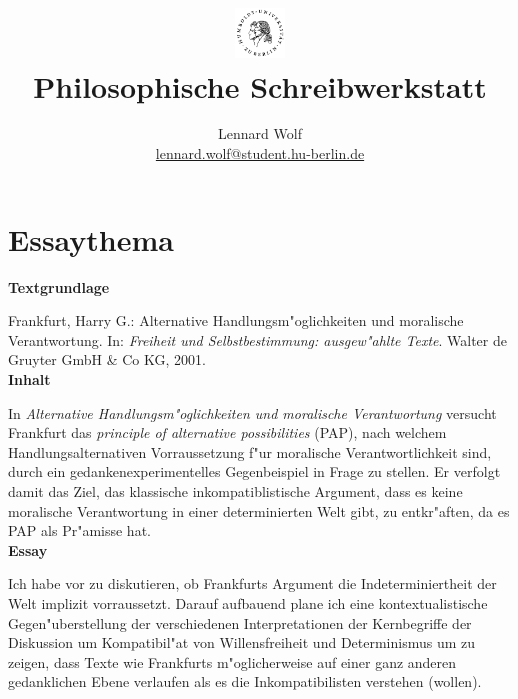 \documentclass[a4paper]{article}
\date{\vspace{-3ex}}
\begin{document}
\title{
    \vspace{-30pt}
	\includegraphics*[width=0.1\textwidth,left]{images/hu_logo2.png}\\
	\vspace{-10pt}
	Philosophische Schreibwerkstatt}
\author{Lennard Wolf\\
        \small{\href{mailto:lennard.wolf@student.hu-berlin.de}{lennard.wolf@student.hu-berlin.de}}}
\maketitle
\vspace{0pt}

\section*{Essaythema}
\large
\vspace{2pt}
\textbf{Textgrundlage}

Frankfurt, Harry G.: Alternative Handlungsm"oglichkeiten und moralische Verantwortung. In: \emph{Freiheit und Selbstbestimmung: ausgew"ahlte Texte}. Walter de Gruyter GmbH \& Co KG, 2001.\\

\noindent \textbf{Inhalt}

In \emph{Alternative Handlungsm"oglichkeiten und moralische Verantwortung} versucht Frankfurt das \emph{principle of alternative possibilities} (PAP), nach welchem Handlungsalternativen Vorraussetzung f"ur moralische Verantwortlichkeit sind, durch ein gedankenexperimentelles Gegenbeispiel in Frage zu stellen. Er verfolgt damit das Ziel, das klassische inkompatiblistische Argument, dass es keine moralische Verantwortung in einer determinierten Welt gibt, zu entkr"aften, da es PAP als Pr"amisse hat.\\

\noindent \textbf{Essay}

Ich habe vor zu diskutieren, ob Frankfurts Argument die Indeterminiertheit der Welt implizit vorraussetzt. Darauf aufbauend plane ich eine kontextualistische Gegen"uberstellung der verschiedenen Interpretationen der Kernbegriffe der Diskussion um Kompatibil"at von Willensfreiheit und Determinismus um zu zeigen, dass Texte wie Frankfurts m"oglicherweise auf einer ganz anderen gedanklichen Ebene verlaufen als es die Inkompatibilisten verstehen (wollen).
\end{document}
